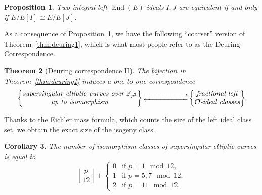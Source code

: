 \documentclass[10pt]{article}
\theoremstyle{plain}
\newtheorem{theorem}{Theorem}
\newtheorem{corollary}[theorem]{Corollary}
\newtheorem{proposition}[theorem]{Proposition}
\theoremstyle{definition}
\DeclareMathOperator{\End}{End} %
\def\F{\ensuremath{\mathbb{F}}}
\def\O{\ensuremath{\mathcal{O}}}
\begin{document}
\begin{proposition}\label{prop:idealclasscurve}
    Two integral left $\End(E)$-ideals $I,J$ are equivalent if and only if
    $E/E[I]\cong E/E[J]$.
\end{proposition}


As a consequence of Proposition~\ref{prop:idealclasscurve},
we have the following ``coarser'' version of Theorem~\ref{thm:deuring1},
which is what most people refer to as the Deuring Correspondence.

\begin{theorem}[Deuring correspondence II]
The bijection in Theorem~\ref{thm:deuring1} induces a one-to-one
correspondence
    \begin{equation*}
        \left\{
            \begin{tabular}{@{} c @{}}
                \emph{supersingular elliptic curves over $\F_{p^2}$}\\
                \emph{up to isomorphism}
            \end{tabular}
        \right\}
        \begin{gathered}
            \overset{}{\xrightarrow{\hspace*{2cm}}} \\[-2ex]
            \underset{}{\xleftarrow{\hspace*{2cm}}}
        \end{gathered}
        \left\{
            \begin{tabular}{@{} c @{}}
                \emph{fractional left} \\
                $\O$\emph{-ideal classes}
            \end{tabular}
        \right\}
    \end{equation*}
\end{theorem}


Thanks to the Eichler mass formula, which counts the size of the
left ideal class set, we obtain the exact size of the
isogeny class. %

\begin{corollary}\label{cor:eichlermass}
  The number of isomorphism classes of supersingular elliptic curves
  is equal to
  \begin{equation*}
    \left\lfloor\frac{p}{12}\right\rfloor +
    \begin{cases}
      0 &\text{if $p=1\mod 12$,}\\
      1 &\text{if $p=5,7\mod 12$,}\\
      2 &\text{if $p=11\mod 12$.}
    \end{cases}
  \end{equation*}
\end{corollary}
\end{document}
